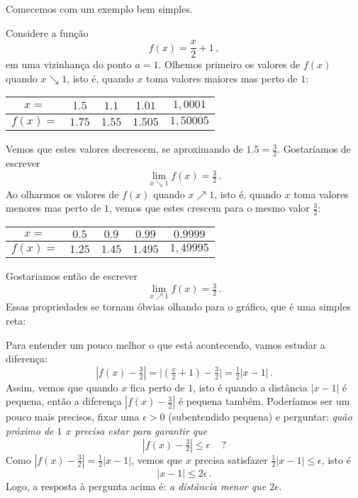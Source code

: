 Comecemos com um exemplo bem simples.
\begin{ex}\label{ExemploLimitesimples}
Considere a função \[f(x)=\frac{x}{2}+1\,,\] 
em uma vizinhança do ponto $a=1$. Olhemos primeiro os
valores de $f(x)$ quando $x\searrow 1$, isto é, quando $x$ toma valores maiores mas perto
de $1$:
\begin{center}
\begin{tabular}{c|c|c|c|c}
$x=$&$1.5$&$1.1$&$1.01$&$1,0001$\\
\hline
$f(x)= $&$1.75$&$1.55$&$1.505$&$1,50005$
\end{tabular}
\end{center}
Vemos que
estes valores decrescem, se aproximando de $1.5=\tfrac32$. Gostaríamos de escrever
\[\lim_{x\searrow 1}f(x)=\tfrac32\,.\]
Ao olharmos
os valores de $f(x)$ quando $x\nearrow 1$, isto é, quando $x$ toma valores menores mas
perto de $1$, 
vemos que estes crescem para o mesmo valor $\tfrac32$: 
\begin{center}
\begin{tabular}{c|c|c|c|c}
$x=$&$0.5$&$0.9$&$0.99$&$0.9999$\\
\hline
$f(x)= $&$1.25$&$1.45$&$1.495$&$1,49995$
\end{tabular}
\end{center}
Gostariamos então de escrever
\[\lim_{x\nearrow 1}f(x)=\tfrac32\,.\]
Essas propriedades se tornam óbvias olhando para o gráfico, que é uma simples reta:
\begin{center}
\begin{bmlimage}\end{bmlimage}
\end{center}
Para entender um pouco melhor o que está acontecendo, vamos 
estudar a diferença:
\[|f(x)-\tfrac32|=\bigl|(\tfrac{x}{2}+1)-\tfrac32\bigr|=\tfrac12|x-1|\,.\]
Assim, vemos que quando $x$ fica perto de $1$, isto é quando a distância 
$|x-1|$ é
pequena, então a diferença $|f(x)-\tfrac32|$ é pequena também.
Poderíamos ser um pouco mais precisos, fixar uma  $\epsilon>0$
(subentendido pequena) e perguntar:
\emph{quão próximo de $1$ $x$ precisa estar para garantir que }
\[|f(x)-\tfrac32|\leq
\epsilon\,\quad ?\]
Como $|f(x)-\tfrac32|=\tfrac12|x-1|$, vemos que $x$ precisa satisfazer
$\tfrac12|x-1|\leq \epsilon$, isto é
\[|x-1|\leq 2\epsilon\,.  \]
Logo, a resposta à pergunta acima é: \emph{a distância menor que $2\epsilon$.}
\end{ex}

